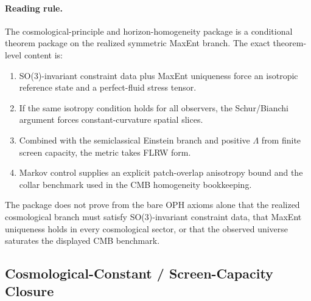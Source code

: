 \paragraph{\textbf{Reading rule.}}
The cosmological-principle and horizon-homogeneity package is a conditional theorem package on the
realized symmetric MaxEnt branch. The exact theorem-level content is:
\begin{enumerate}[leftmargin=2em]
\item SO(3)-invariant constraint data plus MaxEnt uniqueness force an isotropic reference state and
      a perfect-fluid stress tensor.
\item If the same isotropy condition holds for all observers, the Schur/Bianchi argument forces
      constant-curvature spatial slices.
\item Combined with the semiclassical Einstein branch and positive \(\Lambda\) from finite screen
      capacity, the metric takes FLRW form.
\item Markov control supplies an explicit patch-overlap anisotropy bound and the collar benchmark
      used in the CMB homogeneity bookkeeping.
\end{enumerate}
The package does not prove from the bare OPH axioms alone that the realized cosmological branch
must satisfy SO(3)-invariant constraint data, that MaxEnt uniqueness holds in every cosmological
sector, or that the observed universe saturates the displayed CMB benchmark.

\subsection{Cosmological-Constant / Screen-Capacity Closure}

